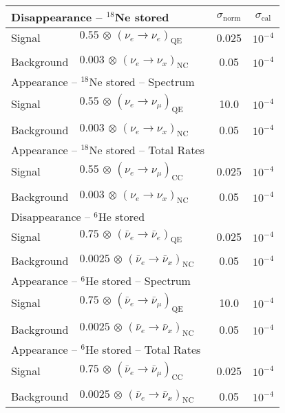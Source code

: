 \begin{center}
\begin{tabular}{|l|ll|c|c|}
\hline \hline
\multicolumn{3}{|l|}{Disappearance -- $^{18}$Ne stored} & $\sigma_\mathrm{norm}$ & $\sigma_\mathrm{cal}$ \\ \hline
Signal & $0.55 \, \otimes \, (\nu_e\rightarrow\nu_e)_{\mathrm{QE}}$ & \hspace{6cm} & 0.025 & $10^{-4}$ \\
 & & & & \\
Background & $0.003 \, \otimes \, (\nu_e \rightarrow \nu_x)_\mathrm{NC}$ & & 0.05 & $10^{-4}$ \\ \hline \hline 
\multicolumn{3}{|l|}{Appearance -- $^{18}$Ne stored -- Spectrum} & & \\ \hline
Signal & $0.55 \, \otimes \, (\nu_e \rightarrow \nu_\mu)_\mathrm{QE}$ & & 10.0 & $10^{-4}$ \\
 & & & & \\
Background & $0.003 \, \otimes \, (\nu_e \rightarrow \nu_x)_\mathrm{NC}$ & & 0.05 & $10^{-4}$
\\ \hline \hline
\multicolumn{3}{|l|}{Appearance -- $^{18}$Ne stored -- Total Rates} & & \\ \hline
Signal & $0.55 \, \otimes \, (\nu_e \rightarrow \nu_\mu)_\mathrm{CC}$ & & 0.025 & $10^{-4}$ \\
 & & & & \\
Background & $0.003 \, \otimes \, (\nu_e \rightarrow \nu_x)_\mathrm{NC}$ & & 0.05 & $10^{-4}$
\\ \hline \hline\multicolumn{3}{|l|}{Disappearance -- $^6$He stored} & &  \\ \hline
Signal & $0.75 \, \otimes \, (\bar{\nu}_e\rightarrow\bar{\nu}_e)_{\mathrm{QE}}$ & & 0.025 & $10^{-4}$ \\
 & & & & \\
Background & $0.0025 \, \otimes \, (\bar{\nu}_e \rightarrow \bar{\nu}_x)_\mathrm{NC}$ & & 0.05 & $10^{-4}$ \\ \hline \hline 
\multicolumn{3}{|l|}{Appearance -- $^6$He stored -- Spectrum} & & \\ \hline
Signal & $0.75 \, \otimes \, (\bar{\nu}_e \rightarrow \bar{\nu}_\mu)_\mathrm{QE}$ & &
10.0 & $10^{-4}$ \\
 & & & & \\
Background & $0.0025 \, \otimes \, (\bar{\nu}_e \rightarrow \bar{\nu}_x)_\mathrm{NC}$ & & 0.05 & $10^{-4}$ \\ \hline \hline
\multicolumn{3}{|l|}{Appearance -- $^6$He stored -- Total Rates} & & \\ \hline
Signal & $0.75 \, \otimes \, (\bar{\nu}_e \rightarrow \bar{\nu}_\mu)_\mathrm{CC}$ & &
0.025 & $10^{-4}$ \\
 & & & & \\
Background & $0.0025 \, \otimes \, (\bar{\nu}_e \rightarrow \bar{\nu}_x)_\mathrm{NC}$ & & 0.05 & $10^{-4}$ \\ \hline \hline
\end{tabular}
\end{center}

